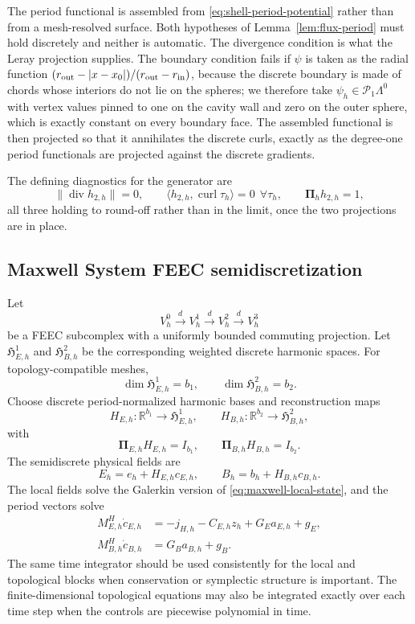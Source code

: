 \documentclass{article}
\DeclareMathOperator{\curl}{curl}
\DeclareMathOperator{\divergence}{div}
\newcommand{\R} {\mathbb R}
\newcommand{\HH}{\mathfrak H}
\newcommand{\Piop}{\boldsymbol\Pi}
\newcommand{\ip}[2]{\langle #1,#2\rangle}
\newcommand{\norm}[1]{\lVert #1\rVert}
\begin{document}
The period functional is assembled from
\eqref{eq:shell-period-potential} rather than from a mesh-resolved
surface. Both hypotheses of Lemma~\ref{lem:flux-period} must hold
discretely and neither is automatic. The divergence condition is what
the Leray projection supplies. The boundary condition fails if $\psi$
is taken as the radial function
$(r_{\rm out}-|x-x_0|)/(r_{\rm out}-r_{\rm in})$, because the discrete
boundary is made of chords whose interiors do not lie on the spheres;
we therefore take $\psi_h\in\mathcal P_1\Lambda^0$ with vertex values
pinned to one on the cavity wall and zero on the outer sphere, which is
exactly constant on every boundary face. The assembled functional is
then projected so that it annihilates the discrete curls, exactly as
the degree-one period functionals are projected against the discrete
gradients.
 
The defining diagnostics for the generator are
\begin{equation}\label{eq:shell-harmonic-diagnostics}
  \norm{\divergence h_{2,h}}=0,\qquad
  \ip{h_{2,h}}{\curl\tau_h}=0\ \ \forall\tau_h,\qquad
  \Piop_h h_{2,h}=1,
\end{equation}
all three holding to round-off rather than in the limit, once the two
projections are in place.


\subsection{Maxwell System FEEC semidiscretization}
\label{sec:maxwell-feec}

Let
\[
  V_h^0\xrightarrow{d}V_h^1\xrightarrow{d}V_h^2\xrightarrow{d}V_h^3
\]
be a FEEC subcomplex with a uniformly bounded commuting projection.  Let $\HH_{E,h}^1$ and $\HH_{B,h}^2$ be the corresponding weighted discrete harmonic spaces.  For topology-compatible meshes,
\[
  \dim\HH_{E,h}^1=b_1,
  \qquad
  \dim\HH_{B,h}^2=b_2.
\]
Choose discrete period-normalized harmonic bases and reconstruction maps
\[
  H_{E,h}:\R^{b_1}\to\HH_{E,h}^1,
  \qquad
  H_{B,h}:\R^{b_2}\to\HH_{B,h}^2,
\]
with
\[
  \Piop_{E,h}H_{E,h}=I_{b_1},
  \qquad
  \Piop_{B,h}H_{B,h}=I_{b_2}.
\]
The semidiscrete physical fields are
\begin{equation}
  E_h=e_h+H_{E,h}c_{E,h},
  \qquad
  B_h=b_h+H_{B,h}c_{B,h}.
\end{equation}
The local fields solve the Galerkin version of \eqref{eq:maxwell-local-state}, and the period vectors solve
\begin{subequations}
\begin{align}
  M_{E,h}^H\dot c_{E,h}
  &=-j_{H,h}-C_{E,h}z_h+G_Ea_{E,h}+g_E,\\
  M_{B,h}^H\dot c_{B,h}
  &=G_Ba_{B,h}+g_B.
\end{align}
\end{subequations}
The same time integrator should be used consistently for the local and topological blocks when conservation or symplectic structure is important.  The finite-dimensional topological equations may also be integrated exactly over each time step when the controls are piecewise polynomial in time.
\end{document}
